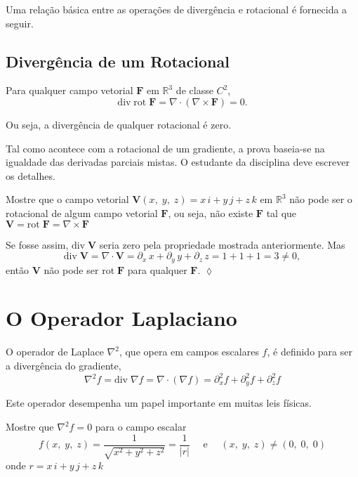 \bigskip
Uma relação básica entre as operações de divergência e rotacional é fornecida a seguir.
%
\subsection*{Divergência de um Rotacional}
%

Para qualquer campo vetorial $\mathbf{F}$ em $\mathbb{R}^{3}$ de classe $C^{2}$,
\begin{equation*}
	\mathrm{div}\;\mathrm{rot}\; \mathbf{F}=\nabla\cdot (\nabla\times \mathbf{F})=0.
\end{equation*}

Ou seja, a divergência de qualquer rotacional é zero.

Tal como acontece com a rotacional de um gradiente, a prova baseia-se na igualdade das derivadas parciais mistas. O estudante da disciplina deve
escrever os detalhes.

\bigskip
\begin{exc}
	Mostre que o campo vetorial $\mathbf{V}(x,\; y,\; z) = x\,i + y\,j + z\,k$  em $\mathbb{R}^{3}$ não pode ser o rotacional de algum campo vetorial $\mathbf{F}$, ou seja, não existe $\mathbf{F}$ tal que  $\mathbf{V} = \mathrm{rot}\; \mathbf{F}= \nabla\times \mathbf{F}$
\end{exc}

\solo
Se fosse assim, $\mathrm{div}\; \mathbf{V}$ seria zero pela propriedade mostrada anteriormente. Mas
\begin{equation*}
	\mathrm{div}\; \mathbf{V}= \nabla\cdot \mathbf{V}=\partial_{x}\, x + \partial_{y}\, y+ \partial_{z}\, z=1+1+1=3 \neq 0,
\end{equation*}
então $\mathbf{V}$ não pode ser $\mathrm{rot}\; \mathbf{F}$ para qualquer $\mathbf{F}$. \hfill $\lozenge$

%
\section{O Operador Laplaciano}
%

O operador de Laplace \(\nabla^{2}\), que opera em campos escalares \(f\), é definido para ser a divergência do gradiente,
\begin{equation*}
	\nabla^{2}f = \mathrm{div}\; \nabla f=\nabla\cdot \left( \nabla f\right) = \partial_{x}^{2}f+ \partial_{y}^{2}f+\partial_{z}^{2}f
\end{equation*}

Este operador desempenha um papel importante em muitas leis físicas.
\begin{exc}\label{exer:1-4}
	Mostre que \(\nabla^{2}f = 0\) para o campo escalar
	\begin{equation*}
		f(x,\; y, \; z)=\dfrac{1}{\sqrt{x^{2}+y^{2}+z^{2}}}=\dfrac{1}{|r|}\quad \text{ e } \quad (x,\; y,\; z) \neq (0,\; 0,\; 0)
	\end{equation*}
	onde \(r =x\, i + y\, j+ z\, k\)
\end{exc}


